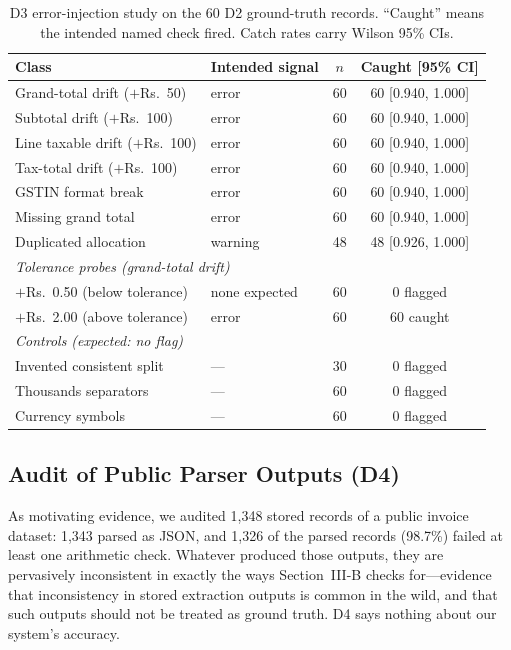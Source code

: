 \documentclass[conference]{IEEEtran}
\begin{document}
\begin{table}[t]
\caption{D3 error-injection study on the 60 D2 ground-truth records. ``Caught'' means the intended named check fired. Catch rates carry Wilson 95\% CIs.}
\label{tab:injection}
\centering
\begin{tabular}{llcc}
\toprule
Class & Intended signal & $n$ & Caught [95\% CI] \\
\midrule
Grand-total drift ($+$Rs.~50) & error & 60 & 60 [0.940, 1.000] \\
Subtotal drift ($+$Rs.~100) & error & 60 & 60 [0.940, 1.000] \\
Line taxable drift ($+$Rs.~100) & error & 60 & 60 [0.940, 1.000] \\
Tax-total drift ($+$Rs.~100) & error & 60 & 60 [0.940, 1.000] \\
GSTIN format break & error & 60 & 60 [0.940, 1.000] \\
Missing grand total & error & 60 & 60 [0.940, 1.000] \\
Duplicated allocation & warning & 48 & 48 [0.926, 1.000] \\
\midrule
\multicolumn{4}{l}{\emph{Tolerance probes (grand-total drift)}}\\
$+$Rs.~0.50 (below tolerance) & none expected & 60 & 0 flagged \\
$+$Rs.~2.00 (above tolerance) & error & 60 & 60 caught \\
\midrule
\multicolumn{4}{l}{\emph{Controls (expected: no flag)}}\\
Invented consistent split & --- & 30 & 0 flagged \\
Thousands separators & --- & 60 & 0 flagged \\
Currency symbols & --- & 60 & 0 flagged \\
\bottomrule
\end{tabular}
\end{table}

\subsection{Audit of Public Parser Outputs (D4)}
As motivating evidence, we audited 1,348 stored records of a public invoice dataset: 1,343 parsed as JSON, and 1,326 of the parsed records (98.7\%) failed at least one arithmetic check. Whatever produced those outputs, they are pervasively inconsistent in exactly the ways Section~III-B checks for---evidence that inconsistency in stored extraction outputs is common in the wild, and that such outputs should not be treated as ground truth. D4 says nothing about our system's accuracy.
\end{document}
